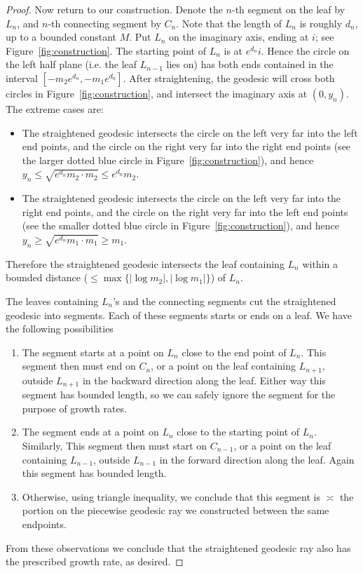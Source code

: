 \documentclass[11pt]{article} %
\theoremstyle{plain}
\theoremstyle{definition}
\numberwithin{equation}{section}
\begin{document}
\begin{proof}
Now return to our construction. Denote the $n$-th segment on the leaf by $L_n$, and $n$-th connecting segment by $C_n$. Note that the length of $L_n$ is roughly $d_n$, up to a bounded constant $M$. Put $L_n$ on the imaginary axis, ending at $i$; see Figure~\ref{fig:construction}. The starting point of $L_n$ is at $e^{d_n}i$. Hence the circle on the left half plane (i.e. the leaf $L_{n-1}$ lies on) has both ends contained in the interval $[-m_2e^{d_n},-m_1e^{d_n}]$. After straightening, the geodesic will cross both circles in Figure~\ref{fig:construction}, and intersect the imaginary axis at $(0,y_n)$. The extreme cases are:
\begin{itemize}[topsep=0mm, itemsep=0mm]
\item The straightened geodesic intersects the circle on the left very far into the left end points, and the circle on the right very far into the right end points (see the larger dotted blue circle in Figure~\ref{fig:construction}), and hence $y_n\le\sqrt{e^{d_n}m_2\cdot m_2}\le e^{d_n}m_2$.
\item The straightened geodesic intersects the circle on the left very far into the right end points, and the circle on the right very far into the left end points (see the smaller dotted blue circle in Figure~\ref{fig:construction}), and hence $y_n\ge\sqrt{e^{d_n}m_1\cdot m_1}\ge m_1$.
\end{itemize}
Therefore the straightened geodesic intersects the leaf containing $L_n$ within a bounded distance ($\le\max\{|\log m_2|,|\log m_1|\}$) of $L_n$.

The leaves containing $L_n$'s and the connecting segments cut the straightened geodesic into segments. Each of these segments starts or ends on a leaf. We have the following possibilities
\begin{enumerate}[topsep=0mm, itemsep=0mm]
    \item The segment starts at a point on $L_n$ close to the end point of $L_n$. This segment then must end on $C_n$, or a point on the leaf containing $L_{n+1}$, outside $L_{n+1}$ in the backward direction along the leaf. Either way this segment has bounded length, so we can safely ignore the segment for the purpose of growth rates.
    \item The segment ends at a point on $L_n$ close to the starting point of $L_n$. Similarly, This segment then must start on $C_{n-1}$, or a point on the leaf containing $L_{n-1}$, outside $L_{n-1}$ in the forward direction along the leaf. Again this segment has bounded length.
    \item Otherwise, using triangle inequality, we conclude that this segment is $\asymp$ the portion on the piecewise geodesic ray we constructed between the same endpoints.
\end{enumerate}
From these observations we conclude that the straightened geodesic ray also has the prescribed growth rate, as desired.
\end{proof}
\end{document}
